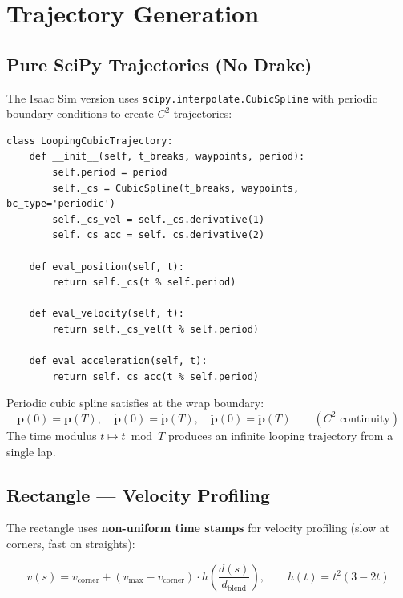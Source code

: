 \documentclass[11pt,a4paper]{article}
\begin{document}
\section{Trajectory Generation}
\label{sec:traj}

\subsection{Pure SciPy Trajectories (No Drake)}

The Isaac Sim version uses \texttt{scipy.interpolate.CubicSpline} with periodic boundary conditions to create $C^2$ trajectories:

\begin{lstlisting}[caption={Looping cubic spline --- \texttt{controller/trajectory.py}}]
class LoopingCubicTrajectory:
    def __init__(self, t_breaks, waypoints, period):
        self.period = period
        self._cs = CubicSpline(t_breaks, waypoints, bc_type='periodic')
        self._cs_vel = self._cs.derivative(1)
        self._cs_acc = self._cs.derivative(2)

    def eval_position(self, t):
        return self._cs(t % self.period)

    def eval_velocity(self, t):
        return self._cs_vel(t % self.period)

    def eval_acceleration(self, t):
        return self._cs_acc(t % self.period)
\end{lstlisting}

\begin{codemath}
Periodic cubic spline satisfies at the wrap boundary:
\[
    \bm{p}(0) = \bm{p}(T), \quad
    \dot{\bm{p}}(0) = \dot{\bm{p}}(T), \quad
    \ddot{\bm{p}}(0) = \ddot{\bm{p}}(T) \qquad (C^2 \text{ continuity})
\]
The time modulus $t \mapsto t \bmod T$ produces an infinite looping trajectory from a single lap.
\end{codemath}

\subsection{Rectangle --- Velocity Profiling}

The rectangle uses \textbf{non-uniform time stamps} for velocity profiling (slow at corners, fast on straights):

\begin{equation}
    v(s) = v_{\mathrm{corner}} + (v_{\mathrm{max}} - v_{\mathrm{corner}}) \cdot h\!\left(\frac{d(s)}{d_{\mathrm{blend}}}\right),
    \qquad h(t) = t^2(3 - 2t)
\end{equation}
\end{document}
